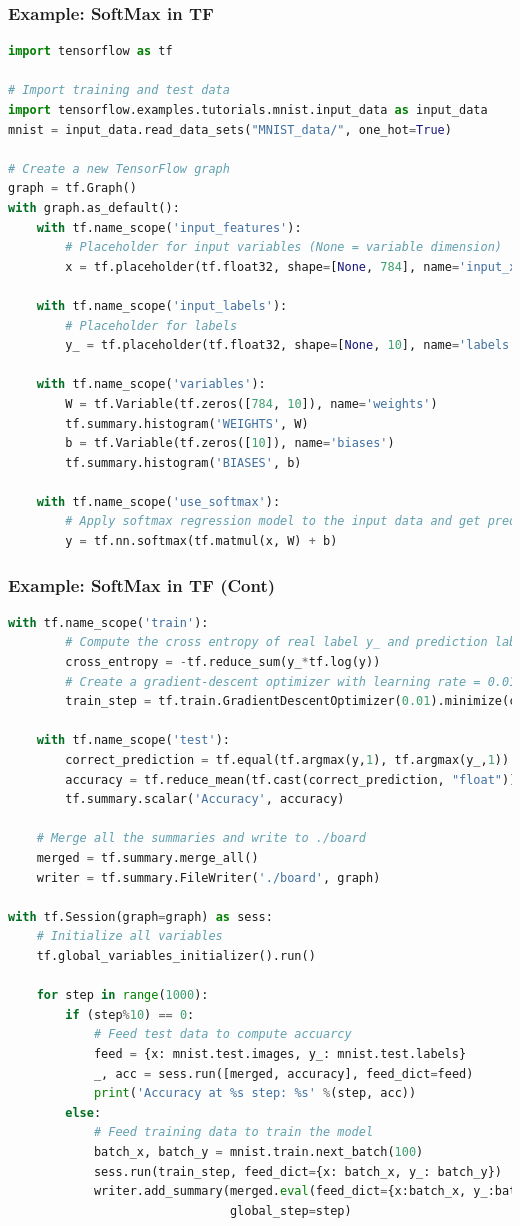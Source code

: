 \begin{frame}[fragile]
  \MyLogo
  \frametitle{Example: SoftMax in TF}  
 
\scriptsize{
\begin{lstlisting}[language=python]
import tensorflow as tf

# Import training and test data
import tensorflow.examples.tutorials.mnist.input_data as input_data
mnist = input_data.read_data_sets("MNIST_data/", one_hot=True)

# Create a new TensorFlow graph
graph = tf.Graph()
with graph.as_default():
	with tf.name_scope('input_features'):
		# Placeholder for input variables (None = variable dimension)
		x = tf.placeholder(tf.float32, shape=[None, 784], name='input_x')
							
	with tf.name_scope('input_labels'):
		# Placeholder for labels
		y_ = tf.placeholder(tf.float32, shape=[None, 10], name='labels')
							
	with tf.name_scope('variables'):
		W = tf.Variable(tf.zeros([784, 10]), name='weights')
		tf.summary.histogram('WEIGHTS', W)
		b = tf.Variable(tf.zeros([10]), name='biases')
		tf.summary.histogram('BIASES', b)
			
	with tf.name_scope('use_softmax'):
		# Apply softmax regression model to the input data and get prediction y
		y = tf.nn.softmax(tf.matmul(x, W) + b)
\end{lstlisting}
}
\end{frame}

\begin{frame}[fragile]
  \MyLogo
  \frametitle{Example: SoftMax in TF (Cont)}  

\ContinueLineNumber
\scriptsize{
\begin{lstlisting}[language=python]
	with tf.name_scope('train'):
		# Compute the cross entropy of real label y_ and prediction labe y
		cross_entropy = -tf.reduce_sum(y_*tf.log(y))
		# Create a gradient-descent optimizer with learning rate = 0.01
		train_step = tf.train.GradientDescentOptimizer(0.01).minimize(cross_entropy)

	with tf.name_scope('test'):
		correct_prediction = tf.equal(tf.argmax(y,1), tf.argmax(y_,1))
		accuracy = tf.reduce_mean(tf.cast(correct_prediction, "float"))
		tf.summary.scalar('Accuracy', accuracy)
	
	# Merge all the summaries and write to ./board
	merged = tf.summary.merge_all()
	writer = tf.summary.FileWriter('./board', graph)
	
with tf.Session(graph=graph) as sess:
	# Initialize all variables
	tf.global_variables_initializer().run()
	
	for step in range(1000):
		if (step%10) == 0:
			# Feed test data to compute accuarcy
			feed = {x: mnist.test.images, y_: mnist.test.labels}
			_, acc = sess.run([merged, accuracy], feed_dict=feed)
			print('Accuracy at %s step: %s' %(step, acc))
		else:
			# Feed training data to train the model
			batch_x, batch_y = mnist.train.next_batch(100)
			sess.run(train_step, feed_dict={x: batch_x, y_: batch_y})
			writer.add_summary(merged.eval(feed_dict={x:batch_x, y_:batch}),
							   global_step=step)
\end{lstlisting}
}

\end{frame}
